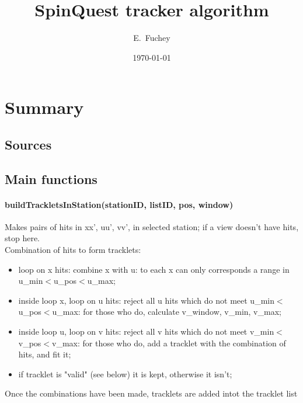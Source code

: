 \documentclass[11pt]{article}
\begin{document}
\title{SpinQuest tracker algorithm}

%
\author{E.~Fuchey}

\date{\today}

\maketitle

\linenumbers
%
\section{Summary}

\subsection{Sources}

\subsection{Main functions}

\paragraph{buildTrackletsInStation(stationID, listID, pos, window)}
Makes pairs of hits in xx', uu', vv', in selected station; if a view doesn't have hits, stop here.\\
Combination of hits to form tracklets:
\begin{itemize}
\item{loop on x hits: combine x with u: to each x can only corresponds a range in u\_min$<$u\_pos$<$u\_max;}
\item{inside loop x, loop on u hits: reject all u hits which do not meet u\_min$<$u\_pos$<$u\_max: for those who do, calculate v\_window, v\_min, v\_max;}
\item{inside loop u, loop on v hits: reject all v hits which do not meet v\_min$<$v\_pos$<$v\_max: for those who do, add a tracklet with the combination of hits, and fit it;}
\item{if tracklet is "valid" (see below) it is kept, otherwise it isn't;}
\end{itemize}
Once the combinations have been made, tracklets are added intot the tracklet list
\end{document}
